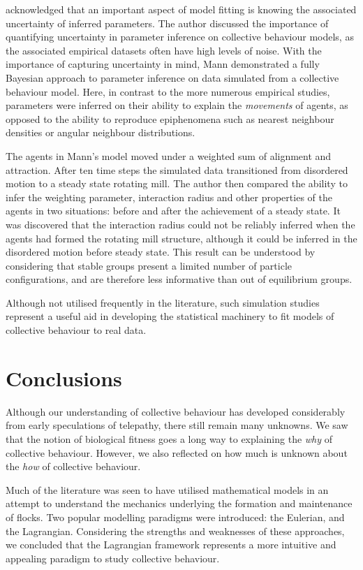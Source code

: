\textcite{mann11} acknowledged that an important aspect of model fitting is
knowing the associated uncertainty of inferred parameters. The author discussed
the importance of quantifying uncertainty in parameter inference on collective
behaviour models, as the associated empirical datasets often have high levels
of noise. With the importance of capturing uncertainty in mind, Mann
demonstrated a fully Bayesian approach to parameter inference on data simulated
from a collective behaviour model. Here, in contrast to the more numerous
empirical studies, parameters were inferred on their ability to explain the
\emph{movements} of agents, as opposed to the ability to reproduce epiphenomena
such as nearest neighbour densities or angular neighbour distributions.

The agents in Mann's model moved under a weighted sum of alignment and
attraction. After ten time steps the simulated data transitioned from
disordered motion to a steady state rotating mill. The author then compared the
ability to infer the weighting parameter, interaction radius and other
properties of the agents in two situations: before and after the achievement of
a steady state. It was discovered that the interaction radius could not be
reliably inferred when the agents had formed the rotating mill structure,
although it could be inferred in the disordered motion before steady state.
This result can be understood by considering that stable groups present a
limited number of particle configurations, and are therefore less informative
than out of equilibrium groups.

Although not utilised frequently in the literature, such simulation studies
represent a useful aid in developing the statistical machinery to fit models of
collective behaviour to real data.

\section*{Conclusions}

Although our understanding of collective behaviour has developed considerably from
early speculations of telepathy, there still remain many unknowns. We saw
that the notion of biological fitness goes a long way to explaining the
\emph{why} of collective behaviour. However, we also reflected on how much is
unknown about the \emph{how} of collective behaviour.

Much of the literature was seen to have utilised mathematical models in an
attempt to understand the mechanics underlying the formation and maintenance of
flocks. Two popular modelling paradigms were introduced: the Eulerian, and the
Lagrangian. Considering the strengths and weaknesses of these approaches, we
concluded that the Lagrangian framework represents a more intuitive and
appealing paradigm to study collective behaviour.

